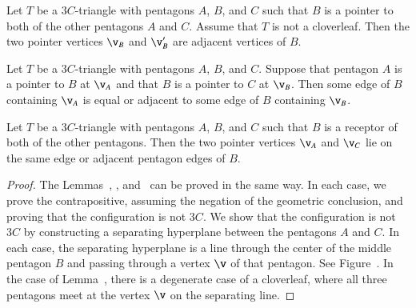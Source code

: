 \begin{lemma} 
Let $T$ be a $3C$-triangle with pentagons $A$, $B$, and $C$ such that
$B$ is a pointer to both of the other pentagons $A$ and $C$.  
Assume that $T$ is not a cloverleaf.
Then the two pointer vertices $\v_B$ and $\v_B'$ are adjacent
vertices of $B$.
\end{lemma}

\begin{lemma}  
Let $T$ be a $3C$-triangle with pentagons $A$, $B$, and $C$.  Suppose
that pentagon $A$ is a pointer to $B$ at $\v_A$ and that $B$ is a
pointer to $C$ at $\v_B$.  Then some edge of $B$ containing $\v_A$ is
equal or adjacent to some edge of $B$ containing $\v_B$.
\end{lemma}

\begin{lemma} 
  Let $T$ be a $3C$-triangle with pentagons $A$, $B$, and $C$ such
  that $B$ is a receptor of both of the other pentagons.  Then the two
  pointer vertices $\v_A$ and $\v_C$ lie on the same edge or adjacent
  pentagon edges of $B$.
\end{lemma}





\begin{proof} The Lemmas~, ,
  and~ can be proved in the same way.  In each case,
  we prove the contrapositive, assuming the negation of the geometric
  conclusion, and proving that the configuration is not $3C$.  We show
  that the configuration is not $3C$ by constructing a separating
  hyperplane between the pentagons $A$ and $C$.  In each case, the
  separating hyperplane is a line through the center of the middle
  pentagon $B$ and passing through a vertex $\v$ of that pentagon.
  See Figure~.  In the case of Lemma~,
  there is a degenerate case of a cloverleaf, where all three
  pentagons meet at the vertex $\v$ on the separating line.
\end{proof}

